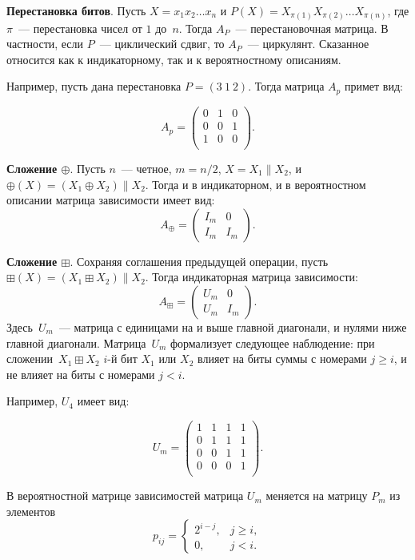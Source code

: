 \documentclass[a4paper,12pt]{report}
\theoremstyle{plain} %
\theoremstyle{definition}
\theoremstyle{remark}
\begin{document}
\begin{large}
{\bf Перестановка битов}.
Пусть $X=x_1x_2\ldots x_n$
и $P(X)=X_{\pi(1)}X_{\pi(2)}\ldots X_{\pi(n)}$,
где $\pi$~--- перестановка чисел от $1$ до~$n$.
Тогда $A_P$~--- перестановочная матрица.
В частности, если $P$~--- циклический сдвиг,
то $A_P$~--- циркулянт. Сказанное относится
как к индикаторному, так и к вероятностному описаниям.

Например, пусть дана перестановка $P = (3~1~2)$. Тогда матрица $A_p$ примет вид:

$$
A_p = 
\begin{pmatrix} 
0 & 1 & 0\\ 
0 & 0 & 1\\ 
1 & 0 & 0\\
\end{pmatrix}.
$$

{\bf Сложение $\oplus$}.
Пусть $n$~--- четное, $m=n/2$,
$X=X_1\parallel X_2$, 
и $\oplus(X)=(X_1\oplus X_2)\parallel X_2$.
Тогда и в индикаторном, и в вероятностном описании 
матрица зависимости имеет вид:
$$
A_\oplus = 
\begin{pmatrix} 
I_m & 0\\ 
I_m & I_m 
\end{pmatrix}.
$$

{\bf Сложение $\boxplus$}.
Сохраняя соглашения предыдущей операции,
пусть $\boxplus(X)=(X_1\boxplus X_2)\parallel X_2$.
Тогда индикаторная матрица зависимости:
$$
A_\boxplus = 
\begin{pmatrix} 
U_m & 0\\ 
U_m & I_m 
\end{pmatrix}.
$$
Здесь~$U_m$~--- матрица с единицами на и выше главной диагонали,
и нулями ниже главной диагонали. Матрица~$U_m$ формализует 
следующее наблюдение: при сложении~$X_1\boxplus X_2$
$i$-й бит $X_1$ или $X_2$ влияет на биты суммы с номерами $j\geq i$,
и не влияет на биты с номерами $j<i$.

Например, $U_4$ имеет вид:

$$
U_m = 
\begin{pmatrix} 
1 & 1 & 1 & 1\\ 
0 & 1 & 1 & 1\\ 
0 & 0 & 1 & 1\\
0 & 0 & 0 & 1\\
\end{pmatrix}.
$$

В вероятностной матрице зависимостей матрица 
$U_m$ меняется на матрицу $P_m$ из элементов 
$$
p_{ij}=\begin{cases}
2^{i-j}, & j\geq i,\\
0,       & j< i.
\end{cases}
$$


\end{large}
\end{document}

